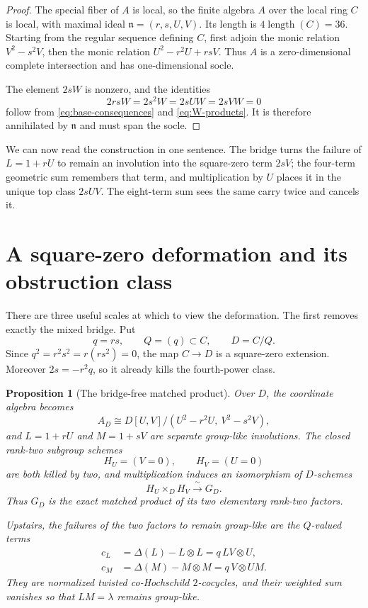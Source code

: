 \documentclass[11pt]{amsart}
\newtheorem{proposition}[theorem]{Proposition}
\theoremstyle{definition}
\theoremstyle{remark}
\newcommand{\length}{\operatorname{length}}
\newcommand{\n}{\mathfrak n}
\newcommand{\ot}{\otimes}
\begin{document}
\begin{proof}
The special fiber of \(A\) is local, so the finite algebra \(A\) over the
local ring \(C\) is local, with maximal ideal
\(\n=(r,s,U,V)\).  Its length is \(4\length(C)=36\).  Starting from the
regular sequence defining \(C\), first adjoin the monic relation
\(V^2-s^2V\), then the monic relation \(U^2-r^2U+rsV\).  Thus \(A\) is a
zero-dimensional complete intersection and has one-dimensional socle.

The element \(2sW\) is nonzero, and the identities
\[
 2rsW=2s^2W=2sUW=2sVW=0
\]
follow from \eqref{eq:base-consequences} and
\eqref{eq:W-products}.  It is therefore annihilated by \(\n\) and must
span the socle.
\end{proof}

We can now read the construction in one sentence.  The bridge turns the
failure of \(L=1+rU\) to remain an involution into the square-zero term
\(2sV\); the four-term geometric sum remembers that term, and
multiplication by \(U\) places it in the unique top class \(2sUV\).  The
eight-term sum sees the same carry twice and cancels it.

\section{A square-zero deformation and its obstruction class}
\label{sec:square-zero}

There are three useful scales at which to view the deformation.  The first
removes exactly the mixed bridge.  Put
\[
 q=rs,
 \qquad Q=(q)\subset C,
 \qquad D=C/Q.
\]
Since \(q^2=r^2s^2=r(rs^2)=0\), the map \(C\to D\) is a square-zero
extension.  Moreover \(2s=-r^2q\), so it already kills the fourth-power
class.

\begin{proposition}[The bridge-free matched product]
\label{prop:matched-product}
Over \(D\), the coordinate algebra becomes
\begin{equation}\label{eq:bridge-free-algebra}
 A_D
 \cong
 D[U,V]/(U^2-r^2U,\ V^2-s^2V),
\end{equation}
and \(L=1+rU\) and \(M=1+sV\) are separate group-like involutions.  The
closed rank-two subgroup schemes
\[
 H_U=(V=0),
 \qquad H_V=(U=0)
\]
are both killed by two, and multiplication induces an isomorphism of
\(D\)-schemes
\begin{equation}\label{eq:matched-factorization}
 H_U\mathbin{\times}_D H_V\xrightarrow{\ \sim\ }G_D.
\end{equation}
Thus \(G_D\) is the exact matched product of its two elementary rank-two
factors.

Upstairs, the failures of the two factors to remain group-like are the
\(Q\)-valued terms
\begin{equation}\label{eq:character-cocycles}
 \begin{split}
  c_L&=\Delta(L)-L\ot L=q\,LV\ot U,\\
  c_M&=\Delta(M)-M\ot M=q\,V\ot UM.
 \end{split}
\end{equation}
They are normalized twisted co-Hochschild \(2\)-cocycles, and their weighted
sum vanishes so that \(LM=\lambda\) remains group-like.
\end{proposition}
\end{document}
